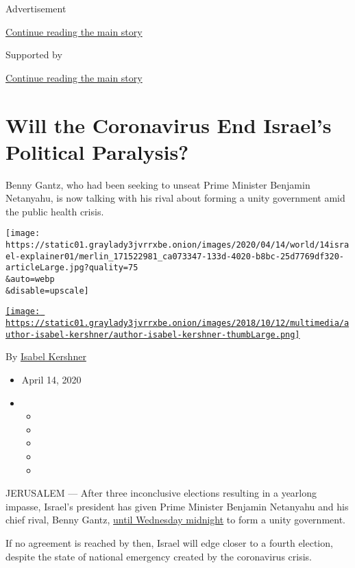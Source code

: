 Advertisement

\protect\hyperlink{after-top}{Continue reading the main story}

Supported by

\protect\hyperlink{after-sponsor}{Continue reading the main story}

\hypertarget{will-the-coronavirus-end-israels-political-paralysis}{%
\section{Will the Coronavirus End Israel's Political
Paralysis?}\label{will-the-coronavirus-end-israels-political-paralysis}}

Benny Gantz, who had been seeking to unseat Prime Minister Benjamin
Netanyahu, is now talking with his rival about forming a unity
government amid the public health crisis.

\texttt{[image: https://static01.graylady3jvrrxbe.onion/images/2020/04/14/world/14israel-explainer01/merlin\_171522981\_ca073347-133d-4020-b8bc-25d7769df320-articleLarge.jpg?quality=75\\\&auto=webp\\\&disable=upscale]}

\href{https://www.nytimes3xbfgragh.onion/by/isabel-kershner}{\texttt{[image: https://static01.graylady3jvrrxbe.onion/images/2018/10/12/multimedia/author-isabel-kershner/author-isabel-kershner-thumbLarge.png]}}

By \href{https://www.nytimes3xbfgragh.onion/by/isabel-kershner}{Isabel
Kershner}

\begin{itemize}
\item
  April 14, 2020
\item
  \begin{itemize}
  \item
  \item
  \item
  \item
  \item
  \end{itemize}
\end{itemize}

JERUSALEM --- After three inconclusive elections resulting in a yearlong
impasse, Israel's president has given Prime Minister Benjamin Netanyahu
and his chief rival, Benny Gantz,
\href{https://www.nytimes3xbfgragh.onion/2020/04/13/world/middleeast/israel-election-netanyahu-gantz.html?action=click\&module=Latest\&pgtype=Homepage}{until
Wednesday midnight} to form a unity government.

If no agreement is reached by then, Israel will edge closer to a fourth
election, despite the state of national emergency created by the
coronavirus crisis.

